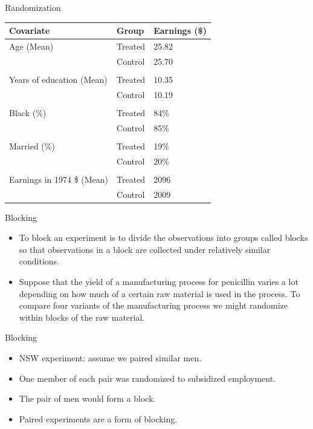 \documentclass[10pt,ignorenonframetext,]{beamer}
\providecommand{\tightlist}{%
\setlength{\itemsep}{0pt}\setlength{\parskip}{0pt}}
\begin{document}
\begin{frame}{Randomization}

\begin{longtable}[]{@{}lll@{}}
\toprule
Covariate & Group & Earnings (\$)\tabularnewline
\midrule
\endhead
Age (Mean) & Treated & 25.82\tabularnewline
& Control & 25.70\tabularnewline
& &\tabularnewline
Years of education (Mean) & Treated & 10.35\tabularnewline
& Control & 10.19\tabularnewline
& &\tabularnewline
Black (\%) & Treated & 84\%\tabularnewline
& Control & 85\%\tabularnewline
& &\tabularnewline
Married (\%) & Treated & 19\%\tabularnewline
& Control & 20\%\tabularnewline
& &\tabularnewline
Earnings in 1974 \$ (Mean) & Treated & 2096\tabularnewline
& Control & 2009\tabularnewline
\bottomrule
\end{longtable}

\end{frame}

\begin{frame}{Blocking}

\begin{itemize}
\item
  To block an experiment is to divide the observations into groups
  called blocks so that observations in a block are collected under
  relatively similar conditions.
\item
  Suppose that the yield of a manufacturing process for penicillin
  varies a lot depending on how much of a certain raw material is used
  in the process. To compare four variants of the manufacturing process
  we might randomize within blocks of the raw material.
\end{itemize}

\end{frame}

\begin{frame}{Blocking}

\begin{itemize}
\tightlist
\item
  NSW experiment: assume we paired similar men.
\item
  One member of each pair was randomized to subsidized employment.
\item
  The pair of men would form a block.
\item
  Paired experiments are a form of blocking.
\end{itemize}

\end{frame}
\end{document}
